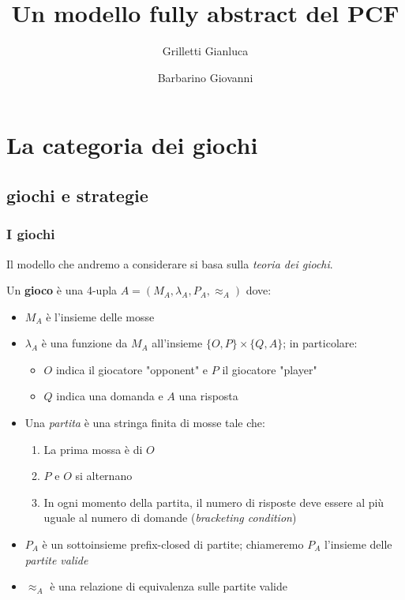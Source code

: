 \documentclass{beamer}
\title{Un modello fully abstract del PCF}
\author{Grilletti Gianluca \and Barbarino Giovanni}
\institute[Unipi]{Università di Pisa}
\begin{document}
\small


\begin{frame}
	\maketitle
	
\end{frame}

\section{La categoria dei giochi}


\subsection{giochi e strategie}

\begin{frame}
	\frametitle{I giochi}
	
	Il modello che andremo a considerare si basa sulla \emph{teoria dei giochi}.
	
	
	Un \textbf{gioco} è una 4-upla $A=( M_A , \lambda_A , P_A , \approx_A )$ dove:
	\begin{itemize}
	\item<2-> $M_A$ è l'insieme delle mosse
	\item<3-> $\lambda_A$ è una funzione da $M_A$ all'insieme $\{ O,P\} \times \{Q,A\}$; in particolare:
		\begin{itemize}
		\item $O$ indica il giocatore "opponent" e $P$ il giocatore "player"
		\item $Q$ indica una domanda e $A$ una risposta
		\end{itemize}
	\item<4-> Una \textit{partita} è una stringa finita di mosse tale che:
		\begin{enumerate}
		\item La prima mossa è di $O$
		\item $P$ e $O$ si alternano
		\item In ogni momento della partita, il numero di risposte deve essere al più uguale al numero di domande (\emph{bracketing condition})
		\end{enumerate}
	\item<5-> $P_A$ è un sottoinsieme prefix-closed di partite; chiameremo $P_A$ l'insieme delle \textit{partite valide}
	\item<6->  $\approx_A$ è una relazione di equivalenza sulle partite valide
	\end{itemize}
	
	
\end{frame}
\end{document}
